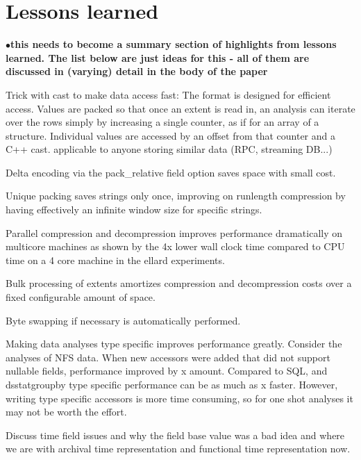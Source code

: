 \documentclass{acm_proc_article-sp}
\newcommand{\fix}[1]{{\LARGE\ensuremath{\bullet}}\textbf{#1}}
\begin{document}

\iffalse

\section{Lessons learned}\label{sec:lessonslearned}

\fix{this needs to become a summary section of highlights from lessons
learned. The list below are just ideas for this - all of them are discussed
in (varying) detail in the body of the paper}

Trick with cast to make data access fast: The format is designed for
efficient access. Values are packed so that once an extent is read in,
an analysis can iterate over the rows simply by increasing a single
counter, as if for an array of a structure.  Individual values are
accessed by an offset from that counter and a C++ cast.  applicable to
anyone storing similar data (RPC, streaming DB...)

Delta encoding via the pack\_relative field option saves space
with small cost.

Unique packing saves strings only once, improving on runlength
compression by having effectively an infinite window size for specific
strings.

Parallel compression and decompression improves performance
dramatically on multicore machines as shown by the 4x lower wall clock
time compared to CPU time on a 4 core machine in the ellard experiments.

Bulk processing of extents amortizes compression and decompression
costs over a fixed configurable amount of space.

Byte swapping if necessary is automatically performed.

Making data analyses type specific improves performance greatly.
Consider the analyses of NFS data.  When new accessors were added that
did not support nullable fields, performance improved by x amount.
Compared to SQL, and dsstatgroupby type specific performance can be as
much as x faster.  However, writing type specific accessors is more
time consuming, so for one shot analyses it may not be worth the
effort.

Discuss time field issues and why the field base value was a bad idea
and where we are with archival time representation and functional time
representation now.
\end{document}
